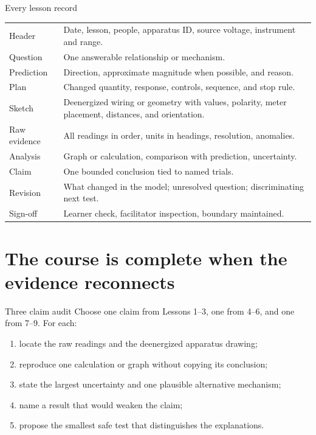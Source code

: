 \begin{teloscard}{Every lesson record}
\begin{tabularx}{\linewidth}{@{}p{.19\linewidth}L@{}}
Header&Date, lesson, people, apparatus ID, source voltage, instrument and range.\\
Question&One answerable relationship or mechanism.\\
Prediction&Direction, approximate magnitude when possible, and reason.\\
Plan&Changed quantity, response, controls, sequence, and stop rule.\\
Sketch&Deenergized wiring or geometry with values, polarity, meter placement,
distances, and orientation.\\
Raw evidence&All readings in order, units in headings, resolution, anomalies.\\
Analysis&Graph or calculation, comparison with prediction, uncertainty.\\
Claim&One bounded conclusion tied to named trials.\\
Revision&What changed in the model; unresolved question; discriminating next test.\\
Sign-off&Learner check, facilitator inspection, boundary maintained.\\
\end{tabularx}
\end{teloscard}

\newpage
{}
\section{The course is complete when the evidence reconnects}
\begin{teloscard}{Three claim audit}
Choose one claim from Lessons 1--3, one from 4--6, and one from 7--9. For each:
\begin{enumerate}
\item locate the raw readings and the deenergized apparatus drawing;
\item reproduce one calculation or graph without copying its conclusion;
\item state the largest uncertainty and one plausible alternative mechanism;
\item name a result that would weaken the claim;
\item propose the smallest safe test that distinguishes the explanations.
\end{enumerate}
\end{teloscard}


